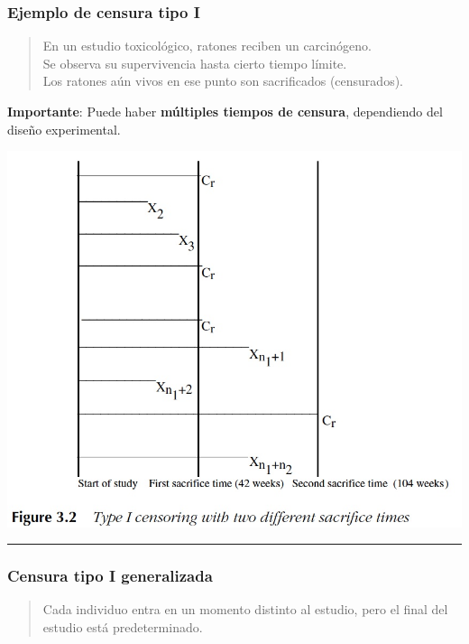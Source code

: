 \documentclass[
  letterpaper,
  DIV=11,
  numbers=noendperiod]{scrartcl}
\begin{document}
\subsubsection{Ejemplo de censura tipo
I}\label{ejemplo-de-censura-tipo-i}

\begin{quote}
En un estudio toxicológico, ratones reciben un carcinógeno.\\
Se observa su supervivencia hasta cierto tiempo límite.\\
Los ratones aún vivos en ese punto son sacrificados (censurados).
\end{quote}

\textbf{Importante}: Puede haber \textbf{múltiples tiempos de censura},
dependiendo del diseño experimental.

\begin{center}
\includegraphics[width=0.9\linewidth,height=\textheight,keepaspectratio]{figura/CensuraI-3.jpg}
\end{center}

\begin{center}\rule{0.5\linewidth}{0.5pt}\end{center}

\subsubsection{Censura tipo I
generalizada}\label{censura-tipo-i-generalizada}

\begin{quote}
Cada individuo entra en un momento distinto al estudio, pero el final
del estudio está predeterminado.
\end{quote}
\end{document}
